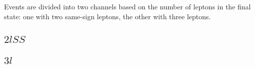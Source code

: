 Events are divided into two channels based on the number of leptons in the final state: one with two same-sign leptons, the other with three leptons.

\subsection{$2lSS$}

\subsection{$3l$}